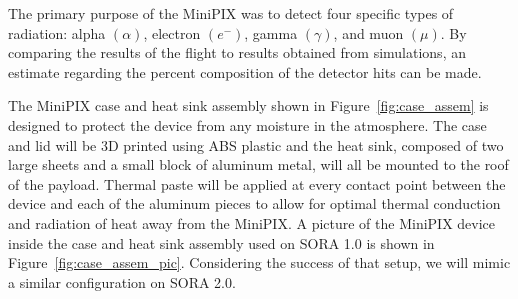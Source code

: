The primary purpose of the MiniPIX was to detect four specific types of radiation: alpha $(\alpha)$, electron $({e^-})$, gamma $({\gamma})$, and muon $({\mu})$. By comparing the results of the flight to results obtained from simulations, an estimate regarding the percent composition of the detector hits can be made.

The MiniPIX case and heat sink assembly shown in Figure~\ref{fig:case_assem} is designed to protect the device from any moisture in the atmosphere. The case and lid will be 3D printed using ABS plastic and the heat sink, composed of two large sheets and a small block of aluminum metal, will all be mounted to the roof of the payload. Thermal paste will be applied at every contact point between the device and each of the aluminum pieces to allow for optimal thermal conduction and radiation of heat away from the MiniPIX. A picture of the MiniPIX device inside the case and heat sink assembly used on SORA 1.0 is shown in Figure~\ref{fig:case_assem_pic}. Considering the success of that setup, we will mimic a similar configuration on SORA 2.0.



